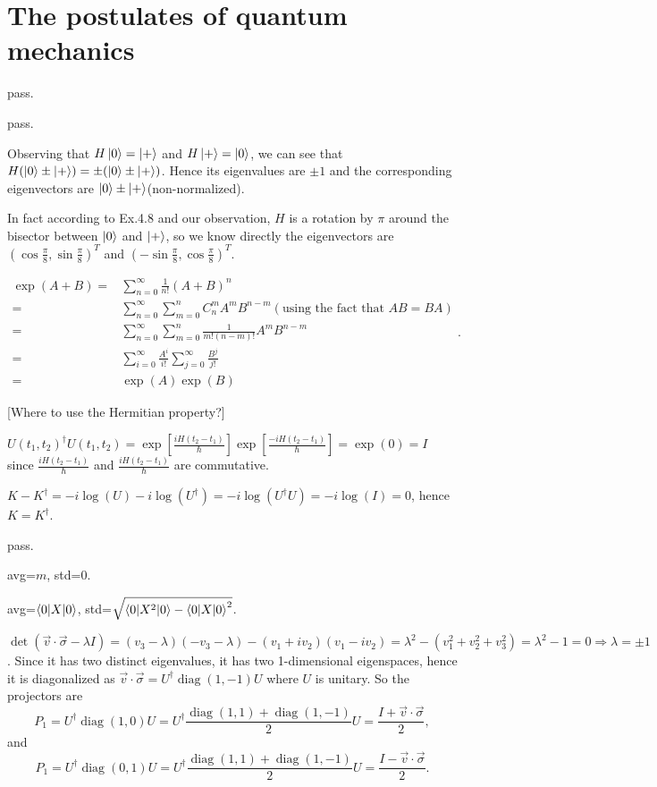 \section{The postulates of quantum mechanics}

\ex pass.

\ex pass.

\ex Observing that $H\left|0\right\rangle = \left|+\right\rangle$ and $H\left|+\right\rangle = \left|0\right\rangle$, we can see that $H(\left|0\right\rangle\pm\left|+\right\rangle)=\pm(\left|0\right\rangle\pm\left|+\right\rangle)$.
Hence its eigenvalues are $\pm1$ and the corresponding eigenvectors are $\left|0\right\rangle\pm\left|+\right\rangle$(non-normalized).

In fact according to Ex.4.8 and our observation, $H$ is a rotation by $\pi$ around the bisector between $\left|0\right\rangle$ and $\left|+\right\rangle$, so we know directly the eigenvectors are $(\cos\frac{\pi}{8},\sin\frac{\pi}{8})^T$ and $(-\sin\frac{\pi}{8},\cos\frac{\pi}{8})^T$.

\ex $$\begin{aligned}
    \exp(A+B) = 
    & \sum_{n=0}^\infty\frac{1}{n!}(A+B)^n
    \\ = & \sum_{n=0}^\infty\sum_{m=0}^nC_n^mA^mB^{n-m}(\text{using the fact that }AB=BA)
    \\ = & \sum_{n=0}^\infty\sum_{m=0}^n\frac{1}{m!(n-m)!}A^mB^{n-m}
    \\ = & \sum_{i=0}^\infty\frac{A^i}{i!}\sum_{j=0}^\infty\frac{B^j}{j!}
    \\ = & \exp(A)\exp(B)
\end{aligned}.$$

[\redstar Where to use the Hermitian property?]

\ex $U(t_1,t_2)^\dagger U(t_1,t_2)=\exp[\frac{iH(t_2-t_1)}{\hbar}]\exp[\frac{-iH(t_2-t_1)}{\hbar}]=\exp(0)=I$ since $\frac{iH(t_2-t_1)}{\hbar}$ and $\frac{iH(t_2-t_1)}{\hbar}$ are commutative.

\ex $K-K^\dagger=-i\log(U)-i\log(U^\dagger)=-i\log(U^\dagger U)=-i\log(I)=0$, hence $K=K^\dagger$.

\ex pass.

\ex avg=$m$, std=0.

\ex avg=$\left\langle0\middle|X\middle|0\right\rangle$, std=$\sqrt{\left\langle0\middle|X^2\middle|0\right\rangle-\left\langle0\middle|X\middle|0\right\rangle^2}$.

\ex $\det(\vec{v}\cdot\vec{\sigma}-\lambda I)=(v_3-\lambda)(-v_3-\lambda)-(v_1+iv_2)(v_1-iv_2)=\lambda^2-(v_1^2+v_2^2+v_3^2)=\lambda^2-1=0\Rightarrow\lambda=\pm1$.
Since it has two distinct eigenvalues, it has two 1-dimensional eigenspaces, hence it is diagonalized as $\vec{v}\cdot\vec{\sigma}=U^\dagger\operatorname{diag}(1,-1)U$ where $U$ is unitary.
So the projectors are
$$P_1=U^\dagger\operatorname{diag}(1,0)U=U^\dagger\frac{\operatorname{diag}(1,1)+\operatorname{diag}(1,-1)}{2}U=\frac{I+\vec{v}\cdot\vec{\sigma}}{2},$$
and
$$P_1=U^\dagger\operatorname{diag}(0,1)U=U^\dagger\frac{\operatorname{diag}(1,1)+\operatorname{diag}(1,-1)}{2}U=\frac{I-\vec{v}\cdot\vec{\sigma}}{2}.$$

